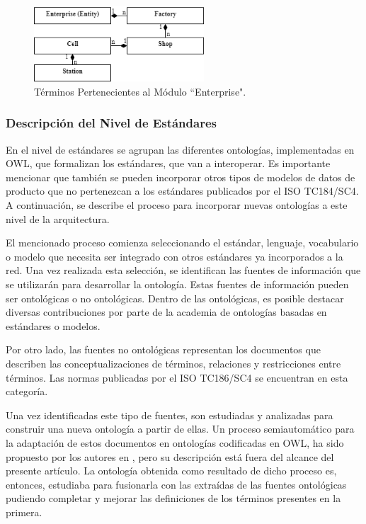 \documentclass[journal]{IEEEtran}
\begin{document}
\begin{figure}[!t]
\centering
\includegraphics[width=2.5in]{figures/figure7.png}
\caption{T\'erminos Pertenecientes al M\'odulo ``Enterprise".}
\label{fig7}
\end{figure}

\subsubsection{Descripci\'on del Nivel de Est\'andares}

En el nivel de est\'andares se agrupan las diferentes ontolog\'ias, implementadas en OWL, que formalizan los est\'andares, que van a interoperar. Es importante mencionar que tambi\'en se pueden incorporar otros tipos de modelos de datos de producto que no pertenezcan a los est\'andares publicados por el ISO TC184/SC4.  A continuaci\'on, se describe el proceso para incorporar nuevas ontolog\'ias a este nivel de la arquitectura. 

El mencionado proceso comienza seleccionando el est\'andar, lenguaje, vocabulario o modelo que necesita ser integrado con otros est\'andares ya incorporados a la red. Una vez realizada esta selecci\'on, se identifican las fuentes de informaci\'on que se utilizar\'an para desarrollar la ontolog\'ia. Estas fuentes de informaci\'on pueden ser ontol\'ogicas o no ontol\'ogicas. Dentro de las ontol\'ogicas, es posible destacar diversas contribuciones por parte de la academia de ontolog\'ias basadas en est\'andares o modelos.

Por otro lado, las fuentes no ontol\'ogicas representan los documentos que describen las conceptualizaciones de t\'erminos, relaciones y restricciones entre t\'erminos. Las normas publicadas por el ISO TC186/SC4 se encuentran en esta categor\'ia. 

Una vez identificadas este tipo de fuentes, son estudiadas y analizadas para construir una nueva ontolog\'ia a partir de ellas. Un proceso semiautom\'atico para la adaptaci\'on de estos documentos en ontolog\'ias codificadas en OWL, ha sido propuesto por los autores en \cite{Fraga2017}, pero su descripci\'on est\'a fuera del alcance del presente art\'iculo. La ontolog\'ia obtenida como resultado de dicho proceso es, entonces, estudiaba para fusionarla con las extra\'idas de las fuentes ontol\'ogicas pudiendo completar y mejorar las definiciones de los t\'erminos presentes en la primera.
\end{document}
